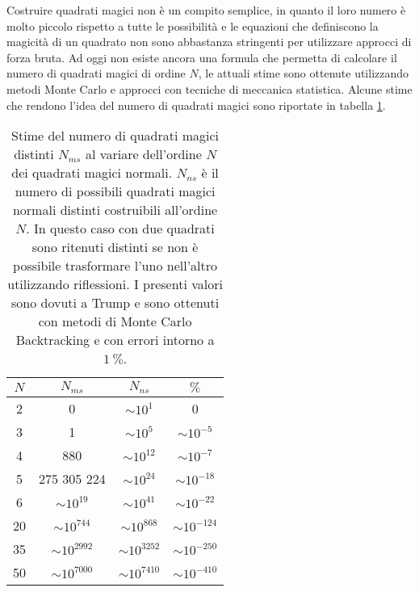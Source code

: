 \documentclass[italian,twoside,twocolumn]{article}
\begin{document}
Costruire quadrati magici non è un compito semplice, in quanto il loro numero è molto piccolo rispetto a tutte le possibilità e le equazioni che definiscono la magicità di un quadrato non sono abbastanza stringenti per utilizzare approcci di forza bruta. Ad oggi non esiste ancora una formula che permetta di calcolare il numero di quadrati magici di ordine $ N $, le attuali stime sono ottenute utilizzando metodi Monte Carlo e approcci con tecniche di meccanica statistica. Alcune stime che rendono l'idea del numero di quadrati magici sono riportate in tabella \ref{tab:numero_quadrati_magici}.

\begin{table}[htbp]
	\centering
	\caption{Stime del numero di quadrati magici distinti $ N_{ms} $ al variare dell'ordine $ N $ dei quadrati magici normali. $ N_{ns} $ è il numero di possibili quadrati magici normali distinti costruibili all'ordine $ N $. In questo caso con due quadrati sono ritenuti distinti se non è possibile trasformare l'uno nell'altro utilizzando riflessioni. I presenti valori sono dovuti a Trump \cite{Trump} e sono ottenuti con metodi di Monte Carlo Backtracking e con errori intorno a $ \SI{1}{\percent} $. %
		}
	\begin{tabular}{cccc}
		$ N $ &       $ N_{ms} $        &       $ N_{ns} $        &  $ \si{\percent} $   \\ \hline
		2   &            0            &    $ \sim  10^{1} $     &          0           \\
		3   &            1            &     $ \sim 10^{5} $     &   $ \sim 10^{-5} $   \\
		4   &           880           &    $ \sim 10^{12} $     &   $ \sim 10^{-7} $   \\
		5   &       275 305 224       &    $ \sim 10^{24} $     &  $ \sim 10^{-18} $   \\
		6   &    $ \sim 10^{19} $     &    $ \sim 10^{41} $     &  $ \sim 10^{-22} $   \\
		20   &    $ \sim 10^{744} $    &    $ \sim 10^{868} $    &  $ \sim 10^{-124} $  \\
		35   &   $ \sim 10^{2992} $    &   $ \sim 10^{3252} $    &  $ \sim 10^{-250} $  \\
		50   &   $ \sim 10^{7000} $    &   $ \sim 10^{7410} $    &  $ \sim 10^{-410} $\\ \hline
	\end{tabular} 
	\label{tab:numero_quadrati_magici}
\end{table}
\end{document}
